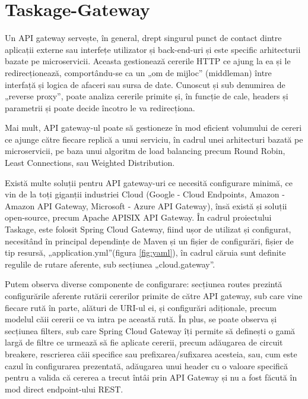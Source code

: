 \section{Taskage-Gateway}

Un API gateway servește, în general, drept singurul punct de contact dintre aplicații externe sau interfețe utilizator și back-end-uri și este specific arhitecturii bazate pe microservicii. Aceasta gestionează cererile HTTP ce ajung la ea și le redirecționează, comportându-se ca un „om de mijloc” (middleman) între interfață și logica de afaceri sau sursa de date.  Cunoscut și sub denumirea de „reverse proxy”, poate analiza cererile primite și, în funcție de cale, headers și parametrii și poate decide încotro le va redirecționa.

Mai mult, API gateway-ul poate să gestioneze în mod eficient volumului de cereri ce ajunge către fiecare replică a unui serviciu, în cadrul unei arhitecturi bazată pe microservicii, pe baza unui algoritm de load balancing precum Round Robin, Least Connections, sau Weighted Distribution.

Există multe soluții pentru API gateway-uri ce necesită configurare minimă, ce vin de la toți giganții industriei Cloud (Google - Cloud Endpoints, Amazon - Amazon API Gateway, Microsoft - Azure API Gateway), însă există și soluții open-source, precum Apache APISIX API Gateway. În cadrul proiectului Taskage, este folosit Spring Cloud Gateway, fiind ușor de utilizat și configurat, necesitând în principal dependințe de Maven și un fișier de configurări, fișier de tip resursă, „application.yml”(figura \ref{fig:yaml}), în cadrul căruia sunt definite regulile de rutare aferente, sub secțiunea „cloud.gateway”.

Putem observa diverse componente de configurare: secțiunea routes prezintă configurările aferente rutării cererilor primite de către API gateway, sub care vine fiecare rută în parte, alături de URI-ul ei, și configurări adiționale, precum modelul căii cererii ce va intra pe această rută. În plus, se poate observa și secțiunea filters, sub care Spring Cloud Gateway îți permite să definești o gamă largă de filtre ce urmează să fie aplicate cererii, precum adăugarea de circuit breakere, rescrierea căii specifice sau prefixarea/sufixarea acesteia, sau, cum este cazul în configurarea prezentată, adăugarea unui header cu o valoare specifică pentru a valida că cererea a trecut întâi prin API Gateway și nu a fost făcută în mod direct endpoint-ului REST.

